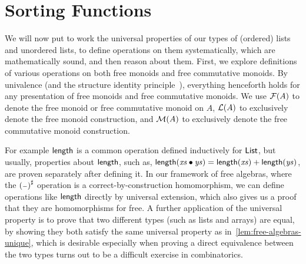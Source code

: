 
\section{Sorting Functions}%
\label{sec:application}

We will now put to work the universal properties of our types of (ordered) lists and unordered lists,
to define operations on them systematically, which are mathematically sound, and then reason about them.
%
First, we explore definitions of various operations on both free monoids and free commutative monoids.
%
By univalence (and the structure identity principle~\cite{aczelVoevodskysUnivalenceAxiom2011,univalentfoundationsprogramHomotopyTypeTheory2013}),
everything henceforth holds for any presentation of free monoids and free commutative monoids.
%
We use $\mathcal{F}(A)$ to denote the free monoid or free commutative monoid on $A$,
$\mathcal{L}(A)$ to exclusively denote the free monoid construction,
and $\mathcal{M}(A)$ to exclusively denote the free commutative monoid construction.

%
For example $\operatorname{\mathsf{length}}$ is a common operation defined inductively for $\operatorname{\mathsf{List}}$,
but usually, properties about $\operatorname{\mathsf{length}}$, such as,
$\operatorname{\mathsf{length}}(\mathit{xs} \mathbin{\bullet} \mathit{ys}) = \operatorname{\mathsf{length}}(\mathit{xs}) + \operatorname{\mathsf{length}}(\mathit{ys})$,
are proven separately after defining it.
%
In our framework of free algebras, where the $\ext{(\blank)}$ operation is a correct-by-construction homomorphism,
we can define operations like $\operatorname{\mathsf{length}}$ directly by universal extension,
which also gives us a proof that they are homomorphisms for free.
%
A further application of the universal property is to prove that two different types (such as lists and arrays) are equal,
by showing they both satisfy the same universal property as in~\cref{lem:free-algebras-unique},
which is desirable especially when proving a direct equivalence between the two types turns out
to be a difficult exercise in combinatorics.

